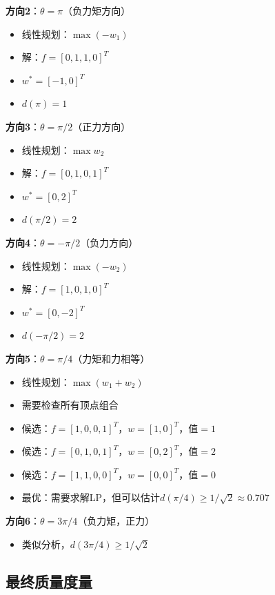 \documentclass[12pt,a4paper]{article}
\begin{document}
\textbf{方向2}：$\theta = \pi$（负力矩方向）
\begin{itemize}
\item 线性规划：$\max (-w_1)$
\item 解：$f = [0, 1, 1, 0]^T$
\item $w^* = [-1, 0]^T$
\item $d(\pi) = 1$
\end{itemize}

\textbf{方向3}：$\theta = \pi/2$（正力方向）
\begin{itemize}
\item 线性规划：$\max w_2$
\item 解：$f = [0, 1, 0, 1]^T$
\item $w^* = [0, 2]^T$
\item $d(\pi/2) = 2$
\end{itemize}

\textbf{方向4}：$\theta = -\pi/2$（负力方向）
\begin{itemize}
\item 线性规划：$\max (-w_2)$
\item 解：$f = [1, 0, 1, 0]^T$
\item $w^* = [0, -2]^T$
\item $d(-\pi/2) = 2$
\end{itemize}

\textbf{方向5}：$\theta = \pi/4$（力矩和力相等）
\begin{itemize}
\item 线性规划：$\max (w_1 + w_2)$
\item 需要检查所有顶点组合
\item 候选：$f = [1, 0, 0, 1]^T$，$w = [1, 0]^T$，值$= 1$
\item 候选：$f = [0, 1, 0, 1]^T$，$w = [0, 2]^T$，值$= 2$
\item 候选：$f = [1, 1, 0, 0]^T$，$w = [0, 0]^T$，值$= 0$
\item 最优：需要求解LP，但可以估计$d(\pi/4) \geq 1/\sqrt{2} \approx 0.707$
\end{itemize}

\textbf{方向6}：$\theta = 3\pi/4$（负力矩，正力）
\begin{itemize}
\item 类似分析，$d(3\pi/4) \geq 1/\sqrt{2}$
\end{itemize}

\subsection{最终质量度量}
\end{document}
